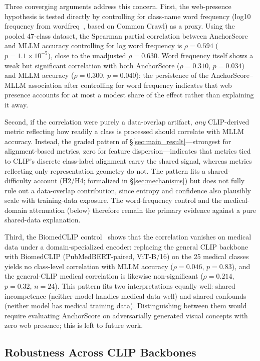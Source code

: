 \documentclass[11pt,a4paper]{article}
\begin{document}
Three converging arguments address this concern. First, the web-presence hypothesis is tested directly by controlling for class-name word frequency (log10 frequency from wordfreq~\cite{wordfreq}, based on Common Crawl) as a proxy. Using the pooled 47-class dataset, the Spearman partial correlation between AnchorScore and MLLM accuracy controlling for log word frequency is $\rho=0.594$ ($p=1.1\times10^{-5}$), close to the unadjusted $\rho=0.630$. Word frequency itself shows a weak but significant correlation with both AnchorScore ($\rho=0.310$, $p=0.034$) and MLLM accuracy ($\rho=0.300$, $p=0.040$); the persistence of the AnchorScore--MLLM association after controlling for word frequency indicates that web presence accounts for at most a modest share of the effect rather than explaining it away.

Second, if the correlation were purely a data-overlap artifact, \emph{any} CLIP-derived metric reflecting how readily a class is processed should correlate with MLLM accuracy. Instead, the graded pattern of \S\ref{sec:main_result}---strongest for alignment-based metrics, zero for feature dispersion---indicates that metrics tied to CLIP's discrete class-label alignment carry the shared signal, whereas metrics reflecting only representation geometry do not. The pattern fits a shared-difficulty account (H2/H4; formalized in \S\ref{sec:mechanisms}) but does not fully rule out a data-overlap contribution, since entropy and confidence also plausibly scale with training-data exposure. The word-frequency control and the medical-domain attenuation (below) therefore remain the primary evidence against a pure shared-data explanation.

Third, the BiomedCLIP control~\cite{zhang2023biomedclip} shows that the correlation vanishes on medical data under a domain-specialized encoder: replacing the general CLIP backbone with BiomedCLIP (PubMedBERT-paired, ViT-B/16) on the 25 medical classes yields no class-level correlation with MLLM accuracy ($\rho=0.046$, $p=0.83$), and the general-CLIP medical correlation is likewise non-significant ($\rho=0.214$, $p=0.32$, $n=24$). This pattern fits two interpretations equally well: shared incompetence (neither model handles medical data well) and shared confounds (neither model has medical training data). Distinguishing between them would require evaluating AnchorScore on adversarially generated visual concepts with zero web presence; this is left to future work.

\subsection{Robustness Across CLIP Backbones}
\label{sec:backbone}
\end{document}
